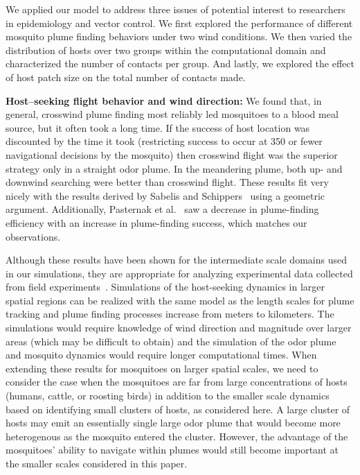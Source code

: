 \documentclass[10pt]{article}
\newif\ifcommentsw
\newcommand{\comment}[1]{\ifcommentsw  $\blacktriangleright$\ \textbf{#1}\ $\blacktriangleleft$ \fi}
\begin{document}

We applied our model to address three issues of potential
interest to researchers in epidemiology and vector control. We
first explored the performance of different mosquito plume finding
behaviors under two wind conditions. We then varied the
distribution of hosts over two groups within the computational
domain and characterized the number of contacts per group. And
lastly, we explored the effect of host patch size on the total
number of contacts made.

\textbf{Host--seeking flight behavior and wind direction: }
We found that, in general, crosswind plume finding most reliably led mosquitoes to a blood meal source, but it often took a long time. If the success of host location was discounted by the time it took (restricting success to occur at 350 or fewer navigational decisions by the mosquito) then crosswind flight was the superior strategy only in a straight odor plume. In the meandering plume, both up- and downwind searching were better than crosswind flight. These results fit very nicely with the results derived by Sabelis and Schippers~\cite{Sabelis1984} using a geometric argument. Additionally, Pasternak et al.~\cite{Pasternak2009} saw a decrease in plume-finding efficiency with an increase in plume-finding success, which matches our observations.

Although these results have been shown for the intermediate scale domains used in our simulations, they are appropriate for analyzing experimental data collected from field experiments~\cite{Foppa2011}.  Simulations of the host-seeking dynamics in larger spatial regions can be realized with the same model as the length scales for plume tracking and plume finding processes increase from meters to kilometers. The simulations would require knowledge of wind direction and magnitude over larger areas (which may be difficult to obtain) and the simulation of the odor plume and mosquito dynamics would require longer computational times.  
When extending these results for mosquitoes on larger spatial scales, we need to consider the case when the mosquitoes are far from large concentrations of hosts (humans, cattle, or roosting birds) in addition to the smaller scale dynamics based on identifying  small clusters of hosts, as considered here.   A large cluster of hosts may emit an essentially single large odor plume that would become more heterogenous as the mosquito entered the cluster.
However, the advantage of the mosquitoes' ability to navigate within plumes would still become important at the smaller scales considered in this paper.
\end{document}
